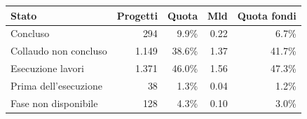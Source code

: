 \begin{tabular}{lrrrr}
\toprule
Stato & Progetti & Quota & Mld \texteuro{} & Quota fondi \\
\midrule
Concluso & 294 & 9.9\% & 0.22 & 6.7\% \\
Collaudo non concluso & 1.149 & 38.6\% & 1.37 & 41.7\% \\
Esecuzione lavori & 1.371 & 46.0\% & 1.56 & 47.3\% \\
Prima dell'esecuzione & 38 & 1.3\% & 0.04 & 1.2\% \\
Fase non disponibile & 128 & 4.3\% & 0.10 & 3.0\% \\
\bottomrule
\end{tabular}
